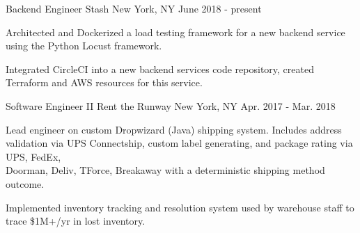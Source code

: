 
\begin{cventries}

  \cventry
    {Backend Engineer} %
    {Stash} %
    {New York, NY} %
    {June 2018 - present} %
    {
      \begin{cvitems} %
        \item {Architected and Dockerized a load testing framework for a new backend service using the Python Locust framework.}
        \item {Integrated CircleCI into a new backend services code repository, created Terraform and AWS resources for this service.}
      \end{cvitems}
    }
\vspace{5mm}
  \cventry
    {Software Engineer II} %
    {Rent the Runway} %
    {New York, NY} %
    {Apr. 2017 - Mar. 2018} %
    {
      \begin{cvitems} %
        \item {Lead engineer on custom Dropwizard (Java) shipping system. Includes address validation via UPS Connectship, custom label generating, and package rating via UPS, FedEx, \\Doorman, Deliv, TForce, Breakaway with a deterministic shipping method outcome.}
        \item {Implemented inventory tracking and resolution system used by warehouse staff to trace \$1M+/yr in lost inventory.}
      \end{cvitems}
    }


\end{cventries}
